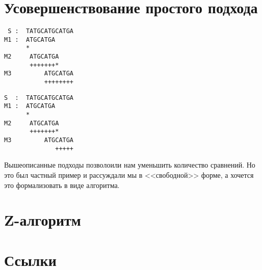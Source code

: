 \documentclass[letterpaper, 11pt]{article}
\begin{document}
\section{Усовершенствование простого подхода}
\par
\begin{verbatim}
 S :  TATGCATGCATGA
M1 :  ATGCATGA
      * 
M2     ATGCATGA
       +++++++*
M3         ATGCATGA
           ++++++++
\end{verbatim}

\par
\begin{verbatim}
S  :  TATGCATGCATGA
M1 :  ATGCATGA
      * 
M2     ATGCATGA
       +++++++*
M3         ATGCATGA
              +++++
\end{verbatim}
\par
Вышеописанные подходы позволоили нам уменьшить количество сравнений. Но это был частный пример и рассуждали мы в <<свободной>> форме, а хочется это формализовать в виде алгоритма.
\section{Z-алгоритм}
\section{Ссылки}
\end{document}
